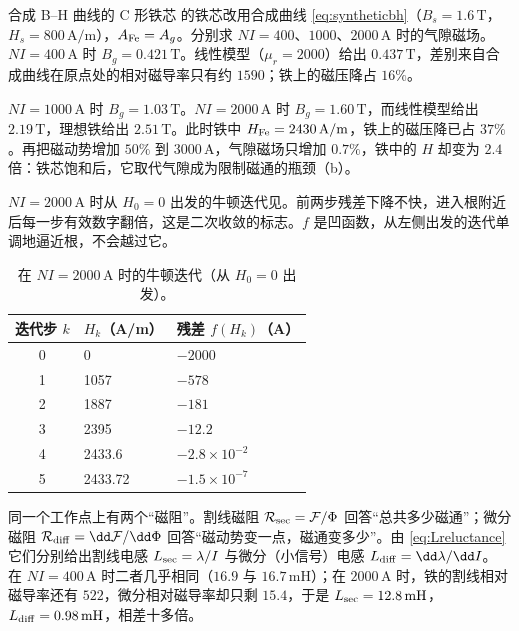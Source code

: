 \begin{example}[label=ex:lumped-nonlinear]{合成 B--H 曲线的 C 形铁芯}
 的铁芯改用合成曲线 \eqref{eq:syntheticbh}（$B_s=1.6\,\mathrm T$，$H_s=800\,\mathrm{A/m}$），$A_{\rm Fe}=A_g$。分别求 $NI=400$、$1000$、$2000\,\mathrm A$ 时的气隙磁场。
\solution
$NI=400\,\mathrm A$ 时 $B_g=0.421\,\mathrm T$。线性模型（$\mu_r=2000$）给出 $0.437\,\mathrm T$，差别来自合成曲线在原点处的相对磁导率只有约 $1590$；铁上的磁压降占 $16\%$。

$NI=1000\,\mathrm A$ 时 $B_g=1.03\,\mathrm T$。$NI=2000\,\mathrm A$ 时 $B_g=1.60\,\mathrm T$，而线性模型给出 $2.19\,\mathrm T$，理想铁给出 $2.51\,\mathrm T$。此时铁中 $H_{\rm Fe}=2430\,\mathrm{A/m}$，铁上的磁压降已占 $37\%$。再把磁动势增加 $50\%$ 到 $3000\,\mathrm A$，气隙磁场只增加 $0.7\%$，铁中的 $H$ 却变为 $2.4$ 倍：铁芯饱和后，它取代气隙成为限制磁通的瓶颈（b）。

$NI=2000\,\mathrm A$ 时从 $H_0=0$ 出发的牛顿迭代见。前两步残差下降不快，进入根附近后每一步有效数字翻倍，这是二次收敛的标志。$f$ 是凹函数，从左侧出发的迭代单调地逼近根，不会越过它。
\end{example}

\begin{table}[htbp]\centering\small
\caption{ 在 $NI=2000\,\mathrm A$ 时的牛顿迭代（从 $H_0=0$ 出发）。}\label{tab:lumped-newton}
\begin{tabularx}{.78\linewidth}{@{}c Y Y@{}}
\toprule
迭代步 $k$ & $H_k$（A/m） & 残差 $f(H_k)$（A）\\ & 0 & $-2000$\\
1 & 1057 & $-578$\\
2 & 1887 & $-181$\\
3 & 2395 & $-12.2$\\
4 & 2433.6 & $-2.8\times10^{-2}$\\
5 & 2433.72 & $-1.5\times10^{-7}$\\
\bottomrule
\end{tabularx}
\end{table}


同一个工作点上有两个“磁阻”。割线磁阻 $\mathcal R_{\rm sec}=\mathcal F/\Phi$ 回答“总共多少磁通”；微分磁阻 $\mathcal R_{\rm diff}=\dd\mathcal F/\dd\Phi$ 回答“磁动势变一点，磁通变多少”。由 \eqref{eq:Lreluctance} 它们分别给出割线电感 $L_{\rm sec}=\lambda/I$ 与微分（小信号）电感 $L_{\rm diff}=\dd\lambda/\dd I$。 在 $NI=400\,\mathrm A$ 时二者几乎相同（$16.9$ 与 $16.7\,\mathrm{mH}$）；在 $2000\,\mathrm A$ 时，铁的割线相对磁导率还有 $522$，微分相对磁导率却只剩 $15.4$，于是 $L_{\rm sec}=12.8\,\mathrm{mH}$，$L_{\rm diff}=0.98\,\mathrm{mH}$，相差十多倍。


